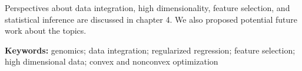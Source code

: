Perspectives about data integration, high dimensionality, feature selection, and statistical inference are discussed in chapter 4. We also proposed potential future work about the topics.

\bigskip
\textbf{Keywords:} genomics; data integration; regularized regression; feature selection; high dimensional data; convex and nonconvex optimization 